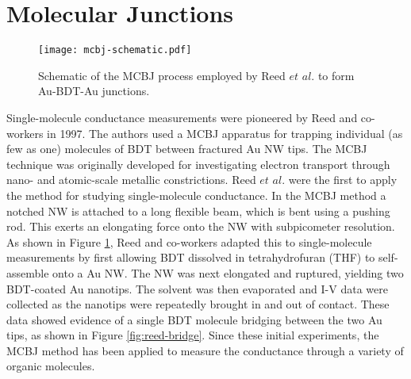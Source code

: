 \documentclass[10pt]{report}  %
\newcommand\findent{\hspace*{\parindent}}
\begin{document}

\section{Molecular Junctions} 

%
% 
%
\begin{figure}[b!]
	\centering
	\texttt{[image: mcbj-schematic.pdf]}
	\caption{Schematic of the MCBJ process employed by Reed $et$ $al.$\protect\cite{Reed:1997} to form Au-BDT-Au junctions.}
	\label{fig:mcbj-schematic}
\end{figure}

\findent Single-molecule conductance measurements were pioneered by Reed and co-workers \cite{Reed:1997} in 1997. The authors used a MCBJ \cite{Muller:1992} apparatus for trapping individual (as few as one) molecules of BDT between fractured Au NW tips. The MCBJ technique was originally developed for investigating electron transport through nano- and atomic-scale metallic constrictions. \cite{Muller:1992} Reed $et$ $al.$ \cite{Reed:1997} were the first to apply the method for studying single-molecule conductance. In the MCBJ method a notched NW is attached to a long flexible beam, which is bent using a pushing rod. This exerts an elongating force onto the NW with subpicometer resolution.\cite{Tsutsui_nl:2008} As shown in Figure \ref{fig:mcbj-schematic}, Reed and co-workers adapted this to single-molecule measurements by first allowing BDT dissolved in tetrahydrofuran (THF) to self-assemble onto a Au NW. The NW was next elongated and ruptured, yielding two BDT-coated Au nanotips. The solvent was then evaporated and I-V data were collected as the nanotips were repeatedly brought in and out of contact. These data showed evidence of a single BDT molecule bridging between the two Au tips, as shown in Figure \ref{fig:reed-bridge}. Since these initial experiments, the MCBJ method has been applied to measure the conductance through a variety of organic molecules. \cite{Kergueris:1999,Weber:2002,Gonzalez:2006,Lortscher:2006,Ulrich:2006,Tsutsui:2006,Lortscher:2007,Wu:2008,Tsutsui:2008,Teramae:2008,Tsutsui:2009,Tsutsui:2009-nanoscale,Horiguchi:2009,Taniguchi:2009,Zotti:2010,Yokota:2010,Kim:2011} 
\end{document}
